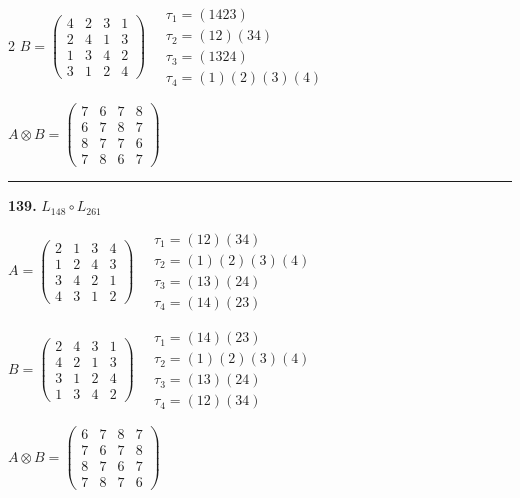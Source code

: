\begin{multicols}{2}
$B = \begin{pmatrix} 4 & 2 & 3 & 1 \\ 2 & 4 & 1 & 3 \\ 1 & 3 & 4 & 2 \\ 3 & 1 & 2 & 4 \end{pmatrix} \quad \begin{matrix} \tau_{1}=(1 4 2 3) \\ \tau_{2}=(1 2)(3 4) \\ \tau_{3}=(1 3 2 4) \\ \tau_{4}=(1)(2)(3)(4) \end{matrix}$

$A \otimes B = \begin{pmatrix} 7 & 6 & 7 & 8 \\ 6 & 7 & 8 & 7 \\ 8 & 7 & 7 & 6 \\ 7 & 8 & 6 & 7 \end{pmatrix}$

\vspace{0.3em}
\hrule
\vspace{0.3em}

\noindent\textbf{139.} $L_{148} \circ L_{261}$

$A = \begin{pmatrix} 2 & 1 & 3 & 4 \\ 1 & 2 & 4 & 3 \\ 3 & 4 & 2 & 1 \\ 4 & 3 & 1 & 2 \end{pmatrix} \quad \begin{matrix} \tau_{1}=(1 2)(3 4) \\ \tau_{2}=(1)(2)(3)(4) \\ \tau_{3}=(1 3)(2 4) \\ \tau_{4}=(1 4)(2 3) \end{matrix}$

$B = \begin{pmatrix} 2 & 4 & 3 & 1 \\ 4 & 2 & 1 & 3 \\ 3 & 1 & 2 & 4 \\ 1 & 3 & 4 & 2 \end{pmatrix} \quad \begin{matrix} \tau_{1}=(1 4)(2 3) \\ \tau_{2}=(1)(2)(3)(4) \\ \tau_{3}=(1 3)(2 4) \\ \tau_{4}=(1 2)(3 4) \end{matrix}$

$A \otimes B = \begin{pmatrix} 6 & 7 & 8 & 7 \\ 7 & 6 & 7 & 8 \\ 8 & 7 & 6 & 7 \\ 7 & 8 & 7 & 6 \end{pmatrix}$


\end{multicols}
